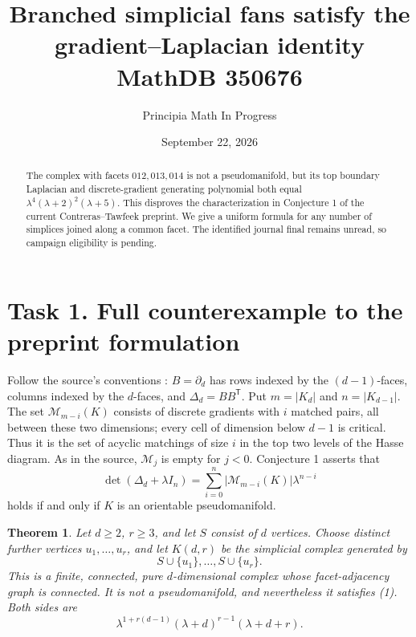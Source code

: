 \documentclass[11pt]{article}
\title{Branched simplicial fans satisfy the gradient--Laplacian identity\\\large MathDB 350676}
\author{Principia Math In Progress}
\date{September 22, 2026}
\newtheorem{theorem}{Theorem}
\newcommand{\MM}{\mathcal M}
\begin{document}
\maketitle
\begin{abstract}
The complex with facets $012,013,014$ is not a pseudomanifold,
but its top boundary Laplacian and discrete-gradient generating
polynomial both equal $\lambda^4(\lambda+2)^2(\lambda+5)$.
This disproves the characterization in Conjecture 1 of the current
Contreras--Tawfeek preprint. We give a uniform formula for any
number of simplices joined along a common facet. The identified
journal final remains unread, so campaign eligibility is pending.
\end{abstract}

\section*{Task 1. Full counterexample to the preprint formulation}
Follow the source's conventions \cite[pp.~3,8,18]{CT}:
$B=\partial_d$ has rows indexed by the $(d-1)$-faces, columns
indexed by the $d$-faces, and $\Delta_d=BB^{\mathsf T}$.
Put $m=|K_d|$ and $n=|K_{d-1}|$.
The set $\MM_{m-i}(K)$ consists of discrete gradients with
$i$ matched pairs, all between these two dimensions; every cell
of dimension below $d-1$ is critical. Thus it is the set of
acyclic matchings of size $i$ in the top two levels of the Hasse
diagram. As in the source, $\MM_j$ is empty for $j<0$.
Conjecture 1 asserts that
\[
 \det(\Delta_d+\lambda I_n)
 =\sum_{i=0}^n |\MM_{m-i}(K)|\lambda^{n-i}                 \tag{1}
\]
holds if and only if $K$ is an orientable pseudomanifold.

\begin{theorem}
Let $d\ge2$, $r\ge3$, and let $S$ consist of $d$ vertices.
Choose distinct further vertices $u_1,\ldots,u_r$, and let
$K(d,r)$ be the simplicial complex generated by
\[
 S\cup\{u_1\},\ldots,S\cup\{u_r\}.
\]
This is a finite, connected, pure $d$-dimensional complex whose
facet-adjacency graph is connected. It is not a pseudomanifold,
and nevertheless it satisfies (1). Both sides are
\[
 \lambda^{1+r(d-1)}(\lambda+d)^{r-1}(\lambda+d+r).           \tag{2}
\]
\end{theorem}
\end{document}
